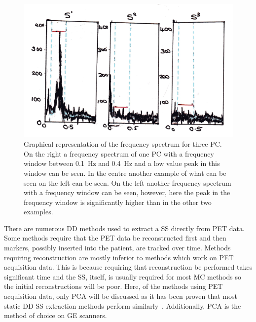                 \begin{figure}
                    \centering
                        
                    \includegraphics[width=1.0\linewidth]{figures/background_pca_window.png}
                        
                    \captionsetup{singlelinecheck=false, justification=raggedright}
                    \caption{Graphical representation of the frequency spectrum for three \gls{PC}. On the right a frequency spectrum of one \gls{PC} with a frequency window between \SI{0.1}{\hertz} and \SI{0.4}{\hertz} and a low value peak in this window can be seen. In the centre another example of what can be seen on the left can be seen. On the left another frequency spectrum with a frequency window can be seen, however, here the peak in the frequency window is significantly higher than in the other two examples.} \label{fig:data_driven_pca_window}
                \end{figure}
                
                There are numerous \gls{DD} methods used to extract a \gls{SS} directly from \gls{PET} data. Some methods require that the \gls{PET} data be reconstructed first and then markers, possibly inserted into the patient, are tracked over time. Methods requiring reconstruction are mostly inferior to methods which work on \gls{PET} acquisition data. This is because requiring that reconstruction be performed takes significant time and the \gls{SS}, itself, is usually required for most \gls{MC} methods so the initial reconstructions will be poor. Here, of the methods using \gls{PET} acquisition data, only \gls{PCA} will be discussed as it has been proven that most static \gls{DD} \gls{SS} extraction methods perform similarly~. Additionally, \gls{PCA} is the method of choice on \gls{GE} scanners.
                
